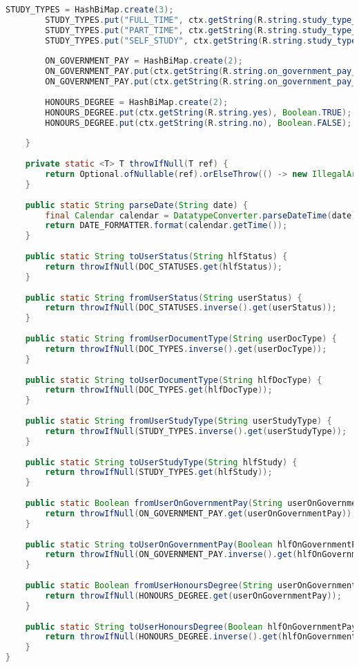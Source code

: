 \begin{lstlisting}[language=Java]
		STUDY_TYPES = HashBiMap.create(3);
		STUDY_TYPES.put("FULL_TIME", ctx.getString(R.string.study_type_full_time));
		STUDY_TYPES.put("PART_TIME", ctx.getString(R.string.study_type_part_time));
		STUDY_TYPES.put("SELF_STUDY", ctx.getString(R.string.study_type_self_study));
		
		ON_GOVERNMENT_PAY = HashBiMap.create(2);
		ON_GOVERNMENT_PAY.put(ctx.getString(R.string.on_government_pay_yes), Boolean.TRUE);
		ON_GOVERNMENT_PAY.put(ctx.getString(R.string.on_government_pay_no), Boolean.FALSE);
		
		HONOURS_DEGREE = HashBiMap.create(2);
		HONOURS_DEGREE.put(ctx.getString(R.string.yes), Boolean.TRUE);
		HONOURS_DEGREE.put(ctx.getString(R.string.no), Boolean.FALSE);
		
	}
	
	private static <T> T throwIfNull(T ref) {
		return Optional.ofNullable(ref).orElseThrow(() -> new IllegalArgumentException(ref + " mustn't be null"));
	}
	
	public static String parseDate(String date) {
		final Calendar calendar = DatatypeConverter.parseDateTime(date);
		return DATE_FORMATTER.format(calendar.getTime());
	}
	
	public static String toUserStatus(String hlfStatus) {
		return throwIfNull(DOC_STATUSES.get(hlfStatus));
	}
	
	public static String fromUserStatus(String userStatus) {
		return throwIfNull(DOC_STATUSES.inverse().get(userStatus));
	}
	
	public static String fromUserDocumentType(String userDocType) {
		return throwIfNull(DOC_TYPES.inverse().get(userDocType));
	}
	
	public static String toUserDocumentType(String hlfDocType) {
		return throwIfNull(DOC_TYPES.get(hlfDocType));
	}
	
	public static String fromUserStudyType(String userStudyType) {
		return throwIfNull(STUDY_TYPES.inverse().get(userStudyType));
	}
	
	public static String toUserStudyType(String hlfStudy) {
		return throwIfNull(STUDY_TYPES.get(hlfStudy));
	}
	
	public static Boolean fromUserOnGovernmentPay(String userOnGovernmentPay) {
		return throwIfNull(ON_GOVERNMENT_PAY.get(userOnGovernmentPay));
	}
	
	public static String toUserOnGovernmentPay(Boolean hlfOnGovernmentPay) {
		return throwIfNull(ON_GOVERNMENT_PAY.inverse().get(hlfOnGovernmentPay));
	}
	
	public static Boolean fromUserHonoursDegree(String userOnGovernmentPay) {
		return throwIfNull(HONOURS_DEGREE.get(userOnGovernmentPay));
	}
	
	public static String toUserHonoursDegree(Boolean hlfOnGovernmentPay) {
		return throwIfNull(HONOURS_DEGREE.inverse().get(hlfOnGovernmentPay));
	}
}

\end{lstlisting}
